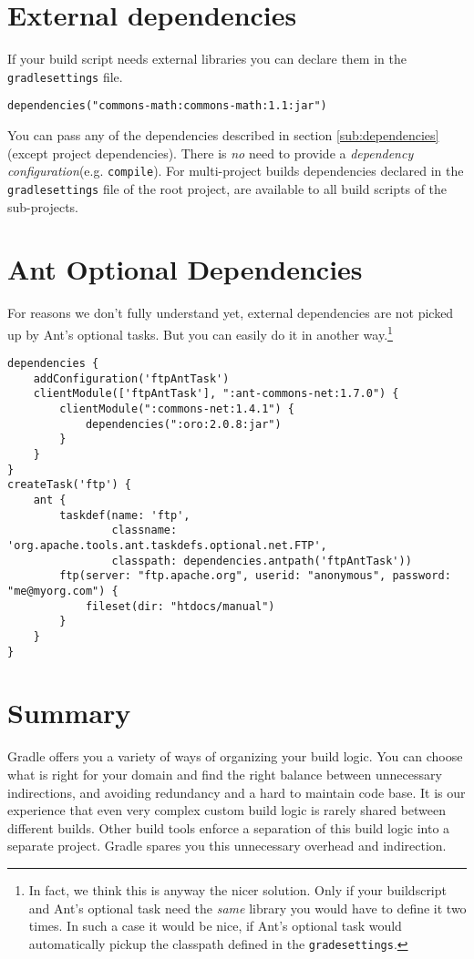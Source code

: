 \section{External dependencies} %
\label{sec:external_dependencies}
If your build script needs external libraries you can declare them in the \texttt{gradlesettings} file.
\begin{Verbatim}[label=gradlesettings]
dependencies("commons-math:commons-math:1.1:jar")
\end{Verbatim}
You can pass any of the dependencies described in section \ref{sub:dependencies} (except project dependencies). There is \emph{no} need to provide a \emph{dependency configuration}(e.g. \texttt{compile}). For multi-project builds dependencies declared in the \texttt{gradlesettings} file of the root project, are available to all build scripts of the sub-projects.

\section{Ant Optional Dependencies} %
\label{sec:ant_optional_dependencies}
For reasons we don't fully understand yet, external dependencies are not picked up by Ant's optional tasks. But you can easily do it in another way.\footnote{In fact, we think this is anyway the nicer solution. Only if your buildscript and Ant's optional task need the \emph{same} library you would have to define it two times. In such a case it would be nice, if Ant's optional task would automatically pickup the classpath defined in the \texttt{gradesettings}.}
\begin{Verbatim}[label=gradlesettings]
dependencies {
    addConfiguration('ftpAntTask')
    clientModule(['ftpAntTask'], ":ant-commons-net:1.7.0") {
        clientModule(":commons-net:1.4.1") {
            dependencies(":oro:2.0.8:jar")
        }
    }
}
createTask('ftp') {
    ant {
        taskdef(name: 'ftp',
                classname: 'org.apache.tools.ant.taskdefs.optional.net.FTP',
                classpath: dependencies.antpath('ftpAntTask'))
        ftp(server: "ftp.apache.org", userid: "anonymous", password: "me@myorg.com") {
            fileset(dir: "htdocs/manual")
        }
    }
}
\end{Verbatim}

\section{Summary} %
\label{sec:philosophy}
Gradle offers you a variety of ways of organizing your build logic. You can choose what is right for your domain and find the right balance between unnecessary indirections, and avoiding redundancy and a hard to maintain code base.
It is our experience that even very complex custom build logic is rarely shared between different builds. Other build tools enforce a separation of this build logic into a separate project. Gradle spares you this unnecessary overhead and indirection.


